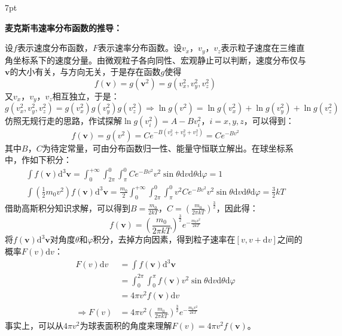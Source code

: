 \documentclass[zihao=-4,UTF8]{report}
\newenvironment{graybox}{%
\def\FrameCommand{%
\hspace{1pt}%
{\color{gray}\small \vrule width 2pt}%
{\color{graybox_color}\vrule width 4pt}%
\colorbox{graybox_color}%
}%
\MakeFramed{\advance\hsize-\width\FrameRestore}%
\noindent\hspace{-4.55pt}%
\begin{adjustwidth}{}{7pt}%
\vspace{2pt}\vspace{2pt}%
}
{%
\vspace{2pt}\end{adjustwidth}\endMakeFramed%
}
\begin{document}
\begin{graybox}
    \textbf{麦克斯韦速率分布函数的推导：}\par
    设$f$表示速度分布函数，$F$表示速率分布函数。设$v_x$，$v_y$，$v_z$表示粒子速度在三维直角坐标系下的速度分量。由微观粒子各向同性、宏观静止可以判断，速度分布仅与$\boldsymbol{v}$的大小有关，与方向无关，于是存在函数$g$使得
    \begin{equation*}
        f(\boldsymbol{v}) = g(\boldsymbol{v}^2) = g(v_x^2,v_y^2,v_z^2)
    \end{equation*}
    又$v_x$，$v_y$，$v_z$相互独立，于是：
    \begin{equation*}
        g(v_x^2,v_y^2,v_z^2) = g(v_x^2)g(v_y^2)g(v_z^2)\Longrightarrow \ln g(v^2) = \ln g(v_x^2) + \ln g(v_y^2)+\ln g(v_z^2)
    \end{equation*}
    仿照无规行走的思路，作试探解$\ln g(v_i^2) = A-Bv_i^2$，$i = x,y,z$，可以得到：
    \begin{equation*}
        f(\boldsymbol{v}) = g(v^2) = Ce^{-B(v_x^2 + v_y^2 +v_z^2)} = Ce^{-Bv^2}
    \end{equation*}
    其中$B$，$C$为待定常量，可由分布函数归一性、能量守恒联立解出。在球坐标系中，作如下积分：
    \begin{gather*}
        \int f(\boldsymbol{v})\mathrm{d}^3\boldsymbol{v} = \int_{0}^{+\infty} \int_{2\pi}^{0}\int_{\pi}^{0} Ce^{-Bv^2}v^2\sin \theta \mathrm{d}v\mathrm{d}\theta\mathrm{d}\varphi = 1\\
        \int (\frac{1}{2}m_0v^2)f(\boldsymbol{v})\mathrm{d}^3\boldsymbol{v} = \frac{m_0}{2}\int_{0}^{+\infty} \int_{2\pi}^{0}\int_{\pi}^{0} v^2Ce^{-Bv^2}v^2\sin \theta \mathrm{d}v\mathrm{d}\theta\mathrm{d}\varphi = \frac{3}{2}kT
    \end{gather*}
    借助高斯积分知识求解，可以得到$B = \frac{m_0}{2kT}$，$C = \left(\frac{m_0}{2\pi kT}\right)^{\frac{3}{2}}$，因此得：
    \begin{equation*}
        f(\boldsymbol{v}) = \left(\frac{m_0}{2\pi kT}\right)^{\frac{3}{2}}e^{-\frac{m_0v^2}{2kT}}
    \end{equation*}
    将$f(\boldsymbol{v})\mathrm{d}^3\boldsymbol{v}$对角度$\theta$和$\varphi$积分，去掉方向因素，得到粒子速率在$[v,v+\mathrm{d}v]$之间的概率$F(v)\mathrm{d }v$：
    \begin{align*}
        F(v)\mathrm{d}v &= \int f(\boldsymbol{v})\mathrm{d}^3\boldsymbol{v} \\
        &= \int_{0}^{2\pi } \int_{0}^{\pi }  f(\boldsymbol{v})v^2\sin \theta  \mathrm{d}v\mathrm{d}\theta\mathrm{d}\varphi\\
        & = 4\pi v^2 f(\boldsymbol{v})\mathrm{d}v \\
        \Longrightarrow  F(v) & = 4\pi v^2\left(\frac{m_0}{2\pi kT}\right)^{\frac{3}{2}}e^{-\frac{m_0v^2}{2kT}}
    \end{align*}
事实上，可以从$4\pi v^2$为球表面积的角度来理解$F(v) = 4\pi v^2 f(\boldsymbol{v})$。
\end{graybox}  
\end{document}
